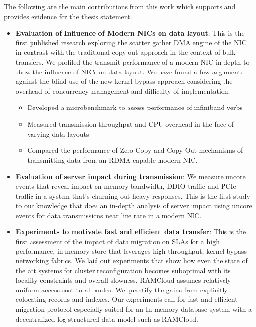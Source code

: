 The following are the main contributions from this work which supports and provides
evidence for the thesis statement.

\begin{itemize}

\item{\textbf{Evaluation of Influence of Modern NICs on data layout}}: This is the first published research exploring the scatter gather DMA engine of the NIC in contrast with the traditional copy out approach in the context of bulk transfers. 
 We profiled the transmit performance of a modern NIC in depth to show the influence of NICs on data layout. 
 We have found a few arguments against the blind use of the new kernel bypass approach considering
 the overhead of concurrency management and difficulty of implementation.
\begin{itemize}

\item Developed a microbenchmark to assess performance of infiniband verbs

\item Measured transmission throughput and CPU overhead in the face of varying
data layouts

\item Compared the performance of Zero-Copy and Copy Out mechanisms of 
transmitting data from an RDMA capable modern NIC.

\end{itemize} 

\item{\textbf{Evaluation of server impact during transmission}}: We measure uncore events that reveal impact on memory bandwidth,
 DDIO traffic and PCIe traffic in a system that's churning out heavy responses. This is the first study to our knowledge that does an 
 in-depth analysis of server impact using uncore events for data transmissions near line rate in a modern NIC.

\item{\textbf{Experiments to motivate fast and efficient data transfer}}: This is the first assessment of the impact of data migration on SLAs for a high performance,
  in-memory store that leverages high throughput, kernel-bypass networking fabrics. 
 We laid out experiments that show how even the state of the art systems for cluster reconfiguration becomes suboptimal with its locality constraints and overall slowness. 
 RAMCloud assumes relatively uniform access cost to all nodes.
 We quantify the gains from explicitly colocating records and indexes.
 Our experiments call for fast and efficient migration protocol especially suited for an In-memory database system with a decentralized log structured data model such as RAMCloud.


\end{itemize}
